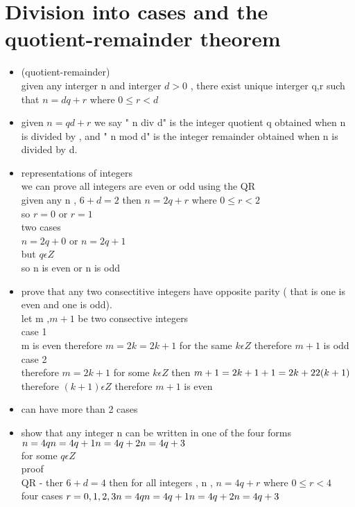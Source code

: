 \documentclass[10pt,letterpaper]{report}
\begin{document}
\section{Division into cases and the quotient-remainder theorem}
\begin{itemize}
\item (quotient-remainder)  \\ given any interger n and interger $d > 0 $ , there exist unique interger q,r such that $n = d q + r $ where $0 \leq r < d $
\item given $ n = q d + r $ we say " n div d" is the integer quotient q obtained when n is divided by , and " n mod d" is the integer remainder obtained when n is divided by d.
\item representations of integers \\ we can prove all integers are even or odd using the QR \\ given any n , $6+ d = 2 $ then $ n = 2 q + r $ where $0 \leq r < 2 $ \\ so $ r = 0 $ or $ r = 1 $ \\ two cases \\ $ n = 2 q + 0$ or $ n = 2q + 1$ \\ but $q \epsilon Z $ \\ so n is even or n is odd
\item prove that any two consectitive integers have opposite parity ( that is one is even and one is odd). \\ let m ,$ m+ 1$ be two consective integers \\ case 1 \\ m is even therefore  $ m = 2 k = 2 k + 1$ for the same $k \epsilon Z $ therefore $m+1$ is odd \\ case 2 \\ therefore  $ m = 2 k + 1 $ for some $ k \epsilon Z $ then $ m + 1 = 2 k + 1 + 1 \\ = 2k + 2 \\ 2(k+1) $ \\ therefore $ (k + 1 ) \epsilon Z $ therefore  $m +1 $ is even 
\item can have more than 2 cases
\item show that any integer n can be written in one of the four forms \\ $ n = 4q \\ n = 4q+1 \\n = 4 q + 2 \\ n = 4 q + 3 $ \\ for some $q \epsilon Z $ \\proof \\ QR - ther $ 6 + d = 4 $ then for all integers , n , $ n = 4 q + r $ where $ 0 \leq r < 4 $ \\ four cases $ r = 0 , 1 , 2 , 3 \\  n = 4q \\ n = 4q+1 \\n = 4 q + 2 \\ n = 4 q + 3 $ 

\end{itemize}
\end{document}
